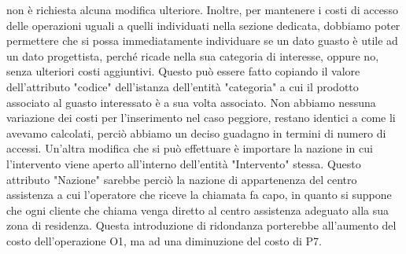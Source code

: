 \documentclass[a4paper, 12pt]{report}
\begin{document}
non è richiesta alcuna modifica ulteriore.\newline
Inoltre, per mantenere i costi di accesso delle operazioni uguali a quelli individuati nella sezione dedicata, dobbiamo poter permettere che si possa immediatamente
individuare se un dato guasto è utile ad un dato progettista, perché ricade nella sua categoria di interesse, oppure no, senza ulteriori costi aggiuntivi. Questo può essere fatto
copiando il valore dell'attributo "codice" dell'istanza dell'entità "categoria" a cui il prodotto associato al guasto interessato è a sua volta associato. Non abbiamo nessuna
variazione dei costi per l'inserimento nel caso peggiore, restano identici a come li avevamo calcolati, perciò abbiamo un deciso guadagno in termini di numero di accessi.\newline
Un'altra modifica che si può effettuare è importare la nazione in cui l'intervento viene aperto all'interno dell'entità "Intervento" stessa. Questo attributo "Nazione" sarebbe perciò
la nazione di appartenenza del centro assistenza a cui l'operatore che riceve la chiamata fa capo, in quanto si suppone che ogni cliente che chiama venga diretto al centro assistenza 
adeguato alla sua zona di residenza. Questa introduzione di ridondanza porterebbe all'aumento del costo dell'operazione O1, ma ad una diminuzione del costo di P7.
\end{document}
